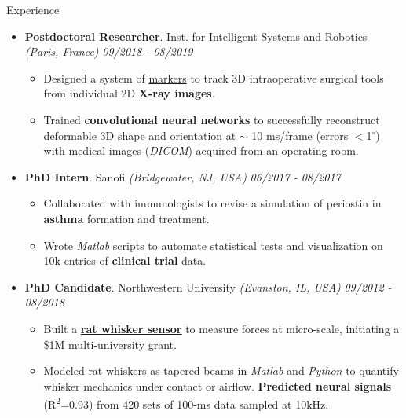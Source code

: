 \documentclass{resume} %
\begin{document}
\begin{rSection}{Experience}
\begin{itemize}[leftmargin=0em]
			\item {\bf Postdoctoral Researcher}{. Inst. for Intelligent Systems and Robotics \textit{(Paris, France)}} \hfill {\em 09/2018 - 08/2019}\\
			\vspace{-5mm}
			\begin{itemize}
				\setlength\itemsep{-1.75em}
				\item  Designed a system of \href{https://aety.github.io/active-catheter-tracking/}{markers} to track 3D intraoperative surgical tools from individual 2D \textbf{X-ray images}.\\ 
				\item  Trained \textbf{convolutional neural networks} to successfully reconstruct deformable 3D shape and orientation at $\sim$ 10 ms/frame (errors $<$1$^\circ$) with medical images (\textit{DICOM}) acquired from an operating room.
			\end{itemize}
			
			\item {\bf PhD Intern}{. Sanofi \textit{(Bridgewater, NJ, USA)}} \hfill {\em 06/2017 - 08/2017}\\
			\vspace{-5mm}
			\begin{itemize}
				\setlength\itemsep{-1.75em}	
				\item Collaborated with immunologists to revise a simulation of periostin in \textbf{asthma} formation and treatment.\\
				\item Wrote \textit{Matlab} scripts to automate statistical tests and visualization on 10k entries of \textbf{clinical trial} data.
			\end{itemize}
			
			\item {\bf PhD Candidate}{. Northwestern University \textit{(Evanston, IL, USA)}} \hfill {\em 09/2012 - 08/2018}\\
			\vspace{-5mm}
			\begin{itemize}
				\setlength\itemsep{-1.75em}
				\item Built a \textbf{\href{https://aety.github.io/rat-whisker-sensor/}{rat whisker sensor}} to measure forces at micro-scale, initiating a \$1M multi-university \href{https://www.nsf.gov/news/mmg/mmg_disp.jsp?med_id=132588}{grant}.\\
				\item Modeled rat whiskers as tapered beams in \textit{Matlab} and \textit{Python} to quantify whisker mechanics under contact or airflow. \textbf{Predicted neural signals} (R\textsuperscript{2}=0.93) from 420 sets of 100-ms data sampled at 10kHz.\\
			\end{itemize}
			
			
		\end{itemize}
		
	\end{rSection}
	
\end{document}
